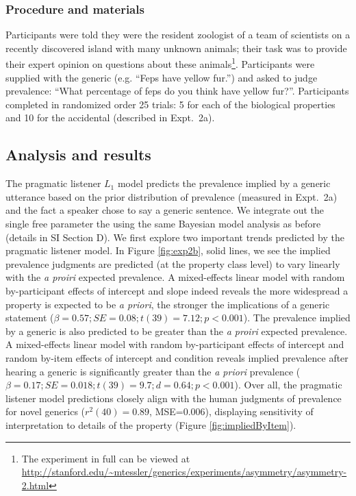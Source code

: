 \documentclass[12pt,letterpaper]{article}
\begin{document}

\subsubsection*{Procedure and materials}

Participants were told they were the resident zoologist of a team of scientists on a recently discovered island with many unknown animals; their task was to provide their expert opinion on questions about these animals\footnote{The experiment in full can be viewed at \url{http://stanford.edu/~mtessler/generics/experiments/asymmetry/asymmetry-2.html}}. 
Participants were supplied with the generic (e.g. ``Feps have yellow fur.'') and asked to judge prevalence: ``What percentage of feps do you think have yellow fur?''. 
Participants completed in randomized order 25 trials: 5 for each of the biological properties and 10 for the accidental (described in Expt.~2a).

\subsection*{Analysis and results}

The pragmatic listener $L_1$ model predicts the prevalence implied by a  generic utterance based on the prior distribution of prevalence (measured in Expt.~2a) and the fact a speaker chose to say a generic sentence.
We integrate out the single free parameter the using the same Bayesian model analysis as before (details in SI Section D).
We first explore two important trends predicted by the pragmatic listener model.
In Figure \ref{fig:exp2b}, solid lines, we see the implied prevalence judgments are predicted (at the property class level) to vary linearly with the \emph{a proiri} expected prevalence. 
A mixed-effects linear model with random by-participant effects of intercept and slope indeed reveals the more widespread a property is expected to be \emph{a priori}, the stronger the implications of a generic statement ($\beta = 0.57; SE = 0.08; t(39) = 7.12; p < 0.001$).
The prevalence implied by a generic is also predicted to be greater than the \emph{a proiri} expected prevalence.
A mixed-effects linear model with random by-participant effects of intercept and random by-item effects of intercept and condition reveals implied prevalence after hearing a generic is significantly greater than the \emph{a priori} prevalence ($\beta = 0.17; SE = 0.018; t(39) = 9.7; d = 0.64; p < 0.001$).
Over all, the pragmatic listener model predictions closely align with the human judgments of prevalence for novel generics ($r^2(40)=0.89$, MSE=0.006), displaying sensitivity of interpretation to details of the property (Figure \ref{fig:impliedByItem}). 
\end{document}
